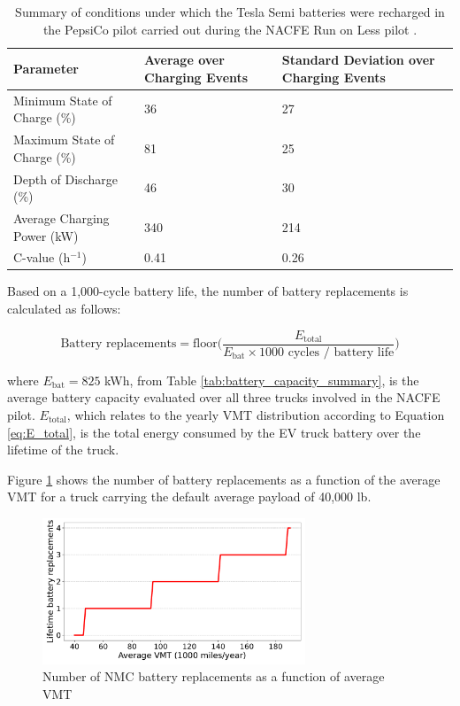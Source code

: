 \begin{table}[H]
\centering
\begin{tabular}{P{4cm}P{4cm}P{4cm}} %
\toprule %
\textbf{Parameter} & \textbf{Average over Charging Events} & \textbf{Standard Deviation over Charging Events} \\ 
\midrule %
Minimum State of Charge (\%) & 36 & 27 \\
\midrule %
Maximum State of Charge (\%) & 81 & 25 \\
\midrule %
Depth of Discharge (\%) & 46 & 30 \\
\midrule %
Average Charging Power (kW) & 340 & 214 \\
\midrule %
C-value (h$^{-1}$) & 0.41 & 0.26 \\
\bottomrule %
\end{tabular}
\caption{Summary of conditions under which the Tesla Semi batteries were recharged in the PepsiCo pilot carried out during the NACFE Run on Less pilot \cite{NACFE_2023}.}
\label{tab:battery_charging_stats}
\end{table}

Based on a 1,000-cycle battery life, the number of battery replacements is calculated as follows:

\begin{equation}
    \label{eq:battery_replacements}
    \text{Battery replacements} = \text{floor}\Bigg(\frac{E_\text{total}}{E_\text{bat} \times 1000 \text{ cycles / battery life}}\Bigg)
\end{equation}

\noindent where $E_\text{bat}=825$ kWh, from Table \ref{tab:battery_capacity_summary}, is the average battery capacity evaluated over all three trucks involved in the NACFE pilot. $E_\text{total}$, which relates to the yearly VMT distribution according to Equation \ref{eq:E_total}, is the total energy consumed by the EV truck battery over the lifetime of the truck. 

Figure \ref{fig:battery_replacements} shows the number of battery replacements as a function of the average VMT for a truck carrying the default average payload of 40,000 lb.

\begin{figure}[H]
        \centering
        \includegraphics[width=0.7\textwidth]{figures/battery_replacements_vs_VMT_payload40000.pdf}
        \caption{Number of NMC battery replacements as a function of average VMT}
        \label{fig:battery_replacements}
\end{figure}

